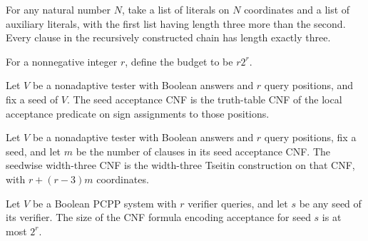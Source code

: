 \begin{theorem}
\label{FABL.tseitinClauseChain_clause_length_eq_three}
\leanok
{}
For any natural number $N$, take a list of literals on $N$ coordinates and a list of
auxiliary literals, with the first list having length three more than the second. Every
clause in the recursively constructed chain has length exactly three.
\end{theorem}

\begin{definition}
\label{FABL.threeQueryBudget}
\leanok
For a nonnegative integer $r$, define the budget to be $r2^r$.
\end{definition}

\begin{definition}
\label{FABL.seedAcceptanceCNF}
\leanok
{}
Let $V$ be a nonadaptive tester with Boolean answers and $r$ query positions, and fix a
seed of $V$. The seed acceptance CNF is the truth-table CNF of the local acceptance
predicate on sign assignments to those positions.
\end{definition}

\begin{definition}
\label{FABL.seedWidthThreeCNF}
\leanok
{}
Let $V$ be a nonadaptive tester with Boolean answers and $r$ query positions, fix a
seed, and let $m$ be the number of clauses in its seed acceptance CNF. The seedwise
width-three CNF is the width-three Tseitin construction on that CNF, with $r+(r-3)m$
coordinates.
\end{definition}

\begin{theorem}
\label{FABL.seedAcceptanceCNF_size_le}
\leanok
{}
Let $V$ be a Boolean PCPP system with $r$ verifier queries, and let $s$ be any seed of
its verifier. The size of the CNF formula encoding acceptance for seed $s$ is at most
$2^r$.
\end{theorem}

